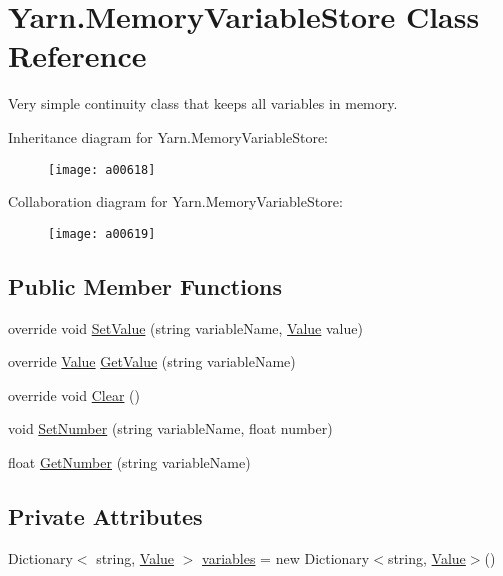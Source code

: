 \hypertarget{a00138}{\section{Yarn.\-Memory\-Variable\-Store Class Reference}
\label{a00138}
}


Very simple continuity class that keeps all variables in memory.  




Inheritance diagram for Yarn.\-Memory\-Variable\-Store\-:
\nopagebreak
\begin{figure}[H]
\begin{center}
\leavevmode
\texttt{[image: a00618]}
\end{center}
\end{figure}


Collaboration diagram for Yarn.\-Memory\-Variable\-Store\-:
\nopagebreak
\begin{figure}[H]
\begin{center}
\leavevmode
\texttt{[image: a00619]}
\end{center}
\end{figure}
\subsection*{Public Member Functions}
\begin{DoxyCompactItemize}
\item 
override void \hyperlink{a00138_a653a459811e5c19549f4b31269093ef5}{Set\-Value} (string variable\-Name, \hyperlink{a00189}{Value} value)
\item 
override \hyperlink{a00189}{Value} \hyperlink{a00138_a0ce77e8245c504a777540e359704aa2a}{Get\-Value} (string variable\-Name)
\item 
override void \hyperlink{a00138_aa6d243e7ef02b91f793a221f509dae69}{Clear} ()
\item 
void \hyperlink{a00044_a48b93de9cd7ae61d0cd9583c8330d3ee}{Set\-Number} (string variable\-Name, float number)
\item 
float \hyperlink{a00044_a1b7f7f4468b2463e7b47986d99362279}{Get\-Number} (string variable\-Name)
\end{DoxyCompactItemize}
\subsection*{Private Attributes}
\begin{DoxyCompactItemize}
\item 
Dictionary$<$ string, \hyperlink{a00189}{Value} $>$ \hyperlink{a00138_aad18acd95297edb8ed496857337f8071}{variables} = new Dictionary$<$string, \hyperlink{a00189}{Value}$>$()
\end{DoxyCompactItemize}


